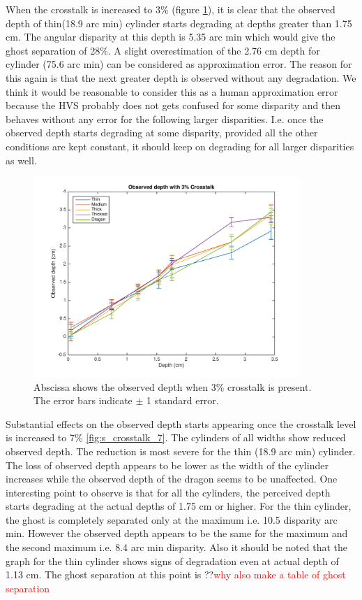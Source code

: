 When the crosstalk is increased to 3\% (figure \ref{fig:s_crosstalk_3}), it is clear that the observed depth of thin(18.9 arc min) cylinder starts degrading at depths greater than 1.75 cm. The angular disparity at this depth is 5.35 arc min which would give the ghost separation of 28\%. A slight overestimation of the 2.76 cm depth for cylinder (75.6 arc min) can be considered as approximation error. The reason for this again is that the next greater depth is observed without any degradation. We think it would be reasonable to consider this as a human approximation error because the HVS probably does not gets confused for some disparity and then behaves without any error for the following larger disparities. I.e. once the observed depth starts degrading at some disparity, provided all the other conditions are kept constant, it should keep on degrading for all larger disparities as well.
\begin{figure}[H]
\centering
    \includegraphics[width=0.9\textwidth]{./Template_Figures/s_crosstalk_3}
    \caption{Abscissa shows the observed depth when 3\% crosstalk is present. The error bars indicate $\pm$ 1 standard error.\label{fig:s_crosstalk_3}}
\end{figure}

Substantial effects on the observed depth starts appearing once the crosstalk level is increased to 7\% \ref{fig:s_crosstalk_7}. The cylinders of all widths show reduced observed depth. The reduction is most severe for the thin (18.9 arc min) cylinder. The loss of observed depth appears to be lower as the width of the cylinder increases while the observed depth of the dragon seems to be unaffected. One interesting point to observe is that for all the cylinders, the perceived depth starts degrading at the actual depths of 1.75 cm or higher. For the thin cylinder, the ghost is completely separated only at the maximum i.e. 10.5 disparity arc min. However the observed depth appears to be the same for the maximum and the second maximum i.e. 8.4 arc min disparity. Also it should be noted that the graph for the thin cylinder shows signs of degradation even at actual depth of 1.13 cm.  The ghost separation at this point is ??\textcolor{red}{why also make a table of ghost separation}

